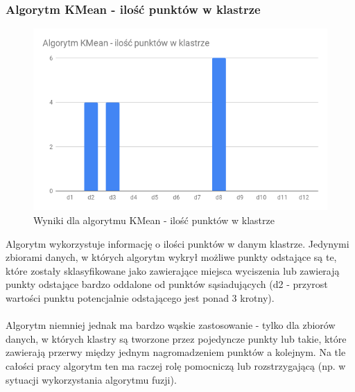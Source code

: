 \documentclass[eng,printmode]{mgr}
\begin{document}
\subsubsection{Algorytm KMean - ilość punktów w klastrze}
\begin{figure}[H]
  \begin{center}
  \includegraphics[scale=0.7]{r_sim}
  \end{center}
  \caption{Wyniki dla algorytmu KMean - ilość punktów w klastrze}
  \label{fig:r_sim}
\end{figure}

Algorytm wykorzystuje informację o ilości punktów w danym klastrze. Jedynymi zbiorami danych, w których algorytm wykrył możliwe punkty odstające są te, które zostały sklasyfikowane jako zawierające miejsca wyciszenia lub zawierają punkty odstające bardzo oddalone od punktów sąsiadujących (d2 - przyrost wartości punktu potencjalnie odstającego jest ponad 3 krotny).
\\\\
 Algorytm niemniej jednak ma bardzo wąskie zastosowanie - tylko dla zbiorów danych, w których klastry są tworzone przez pojedyncze punkty lub takie, które zawierają przerwy między jednym nagromadzeniem punktów a kolejnym. Na tle całości pracy algorytm ten ma raczej rolę pomocniczą lub rozstrzygającą (np. w sytuacji wykorzystania algorytmu fuzji).
\end{document}
